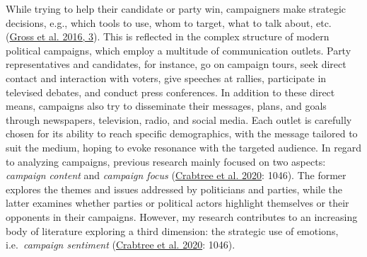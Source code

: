 \documentclass[a4paper,11pt]{article}
\begin{document}
While trying to help their candidate or party win, campaigners make strategic decisions, e.g., which tools to use, whom to target, what to talk about, etc. (\protect\hyperlink{ref-grossGamePracticalGuide2016}{Gross et al. 2016, 3}). This is reflected in the complex structure of modern political campaigns, which employ a multitude of communication outlets. Party representatives and candidates, for instance, go on campaign tours, seek direct contact and interaction with voters, give speeches at rallies, participate in televised debates, and conduct press conferences. In addition to these direct means, campaigns also try to disseminate their messages, plans, and goals through newspapers, television, radio, and social media. Each outlet is carefully chosen for its ability to reach specific demographics, with the message tailored to suit the medium, hoping to evoke resonance with the targeted audience. In regard to analyzing campaigns, previous research mainly focused on two aspects: \emph{campaign content} and \emph{campaign focus} (\protect\hyperlink{ref-crabtreeItNotOnly2020}{Crabtree et al. 2020}: 1046). The former explores the themes and issues addressed by politicians and parties, while the latter examines whether parties or political actors highlight themselves or their opponents in their campaigns. However, my research contributes to an increasing body of literature exploring a third dimension: the strategic use of emotions, i.e.~\emph{campaign sentiment} (\protect\hyperlink{ref-crabtreeItNotOnly2020}{Crabtree et al. 2020}: 1046).
\end{document}
